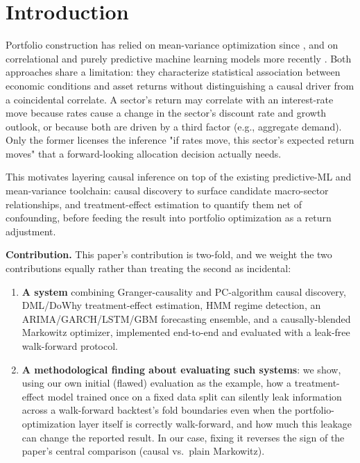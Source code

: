 \documentclass[10pt,twocolumn]{article}
\begin{document}
\section{Introduction}

Portfolio construction has relied on mean-variance optimization since
\citet{markowitz1952portfolio}, and on correlational and purely
predictive machine learning models more recently
\citep{gu2020empirical}. Both approaches share a limitation: they
characterize statistical association between economic conditions and
asset returns without distinguishing a causal driver from a coincidental
correlate. A sector's return may correlate with an interest-rate move
because rates cause a change in the sector's discount rate and growth
outlook, or because both are driven by a third factor (e.g., aggregate
demand). Only the former licenses the inference "if rates move, this
sector's expected return moves" that a forward-looking allocation
decision actually needs.

This motivates layering causal inference on top of the existing
predictive-ML and mean-variance toolchain: causal discovery to surface
candidate macro-sector relationships, and treatment-effect estimation to
quantify them net of confounding, before feeding the result into
portfolio optimization as a return adjustment.

\textbf{Contribution.} This paper's contribution is two-fold, and we
weight the two contributions equally rather than treating the second as
incidental:

\begin{enumerate}
  \item \textbf{A system} combining Granger-causality and PC-algorithm
  causal discovery, DML/DoWhy treatment-effect estimation, HMM regime
  detection, an ARIMA/GARCH/LSTM/GBM forecasting ensemble, and a
  causally-blended Markowitz optimizer, implemented end-to-end and
  evaluated with a leak-free walk-forward protocol.
  \item \textbf{A methodological finding about evaluating such systems}:
  we show, using our own initial (flawed) evaluation as the example, how
  a treatment-effect model trained once on a fixed data split can silently
  leak information across a walk-forward backtest's fold boundaries even
  when the portfolio-optimization layer itself is correctly walk-forward,
  and how much this leakage can change the reported result. In our case,
  fixing it reverses the sign of the paper's central comparison (causal
  vs.\ plain Markowitz).
\end{enumerate}
\end{document}
